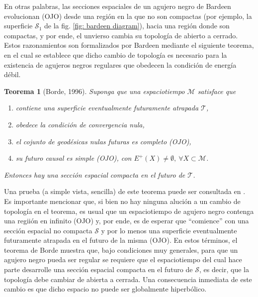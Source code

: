 \documentclass{article}
\numberwithin{equation}{section}
\newtheorem{theorem}{Teorema}[section]
\theoremstyle{definition}
\begin{document}
En otras palabras, las secciones espaciales de un agujero negro de Bardeen evolucionan (OJO) desde una región en la que no son compactas (por ejemplo, la superficie $\mathcal{S}_{1}$ de la fig. \ref{fig: bardeen diagram}), hacia una región donde son compactas, y por ende, el unvierso cambia su topología de abierto a cerrado. Estos razonamientos son formalizados por Bardeen mediante el siguiente teorema, en el cual se establece que dicho cambio de topología es necesario para la existencia de agujeros negros regulares que obedecen la condición de energía débil.\\

\begin{theorem}[Borde, 1996]
	\label{borde reg thm}
	Suponga que una espaciotiempo $\mathcal{M}$ satisface que
	
	\begin{enumerate}[i]
		\item contiene una superficie eventualmente futuramente atrapada $\mathcal{T}$,
		
		\item obedece la condición de convergencia nula,
		
		\item el cojunto de geodésicas nulas futuras es completo (OJO),
		
		\item su futuro causal es simple (OJO), con $E^{+}(X) \neq \emptyset,\ \forall X \subset \mathcal{M}$.
	\end{enumerate}
	
	Entonces hay una sección espacial compacta en el futuro de $\mathcal{T}$.
\end{theorem}

Una prueba (a simple vista, sencilla) de este teorema puede ser consultada en \cite{borde1996}. Es importante mencionar que, si bien no hay ninguna alución a un cambio de topología en el teorema, es usual que un espaciotiempo de agujero negro contenga una regiión en infinito (OJO) y, por ende, es de esperar que ``comience'' con una sección espacial no compacta $\mathcal{S}$ y por lo menos una superficie eventualmente futuramente atrapada en el futuro de la misma (OJO). En estos términos, el teorema de Borde muestra que, bajo condiciones muy generales, para que un agujero negro pueda ser regular se requiere que el espaciotiempo del cual hace parte desarrolle una sección espacial compacta en el futuro de $\mathcal{S}$, es decir, que la topología debe cambiar de abierta a cerrada. Una consecuencia inmediata de este cambio es que dicho espacio no puede ser globalmente hiperbólico.\\
\end{document}
